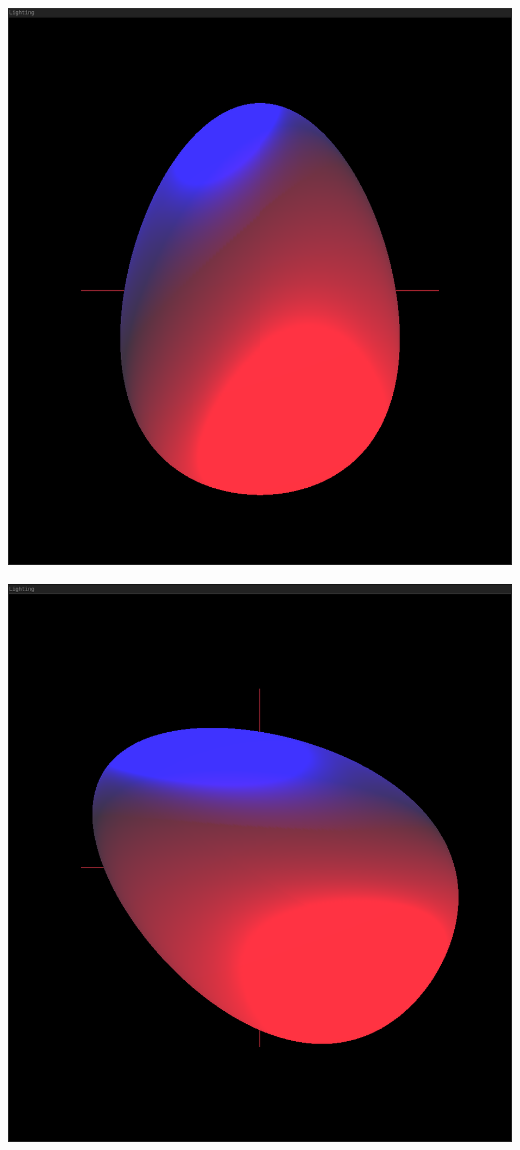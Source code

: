 \documentclass[polish,polish,a4paper]{report}
\begin{document}
\pagebreak
\begin{center}
\includegraphics[scale=2]{egg_light2}
\end{center}

\pagebreak
\begin{center}
\includegraphics[scale=2]{egg_light3}
\end{center}
\end{document}

